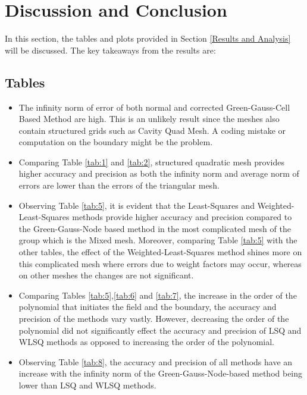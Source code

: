 \documentclass{article}
\begin{document}
\newpage
\section{Discussion and Conclusion}
In this section, the tables and plots provided in Section \ref{Results and Analysis} will be discussed. The key takeaways from the results are:
\subsection{Tables}
\label{Tables}

\begin{itemize}
    \item The infinity norm of error of both normal and corrected Green-Gauss-Cell Based Method are high. This is an unlikely result since the meshes also contain structured grids such as Cavity Quad Mesh. A coding mistake or computation on the boundary might be the problem.
    \item Comparing Table \ref{tab:1} and \ref{tab:2}, structured quadratic mesh provides higher accuracy and precision as both the infinity norm and average norm of errors are lower than the errors of the triangular mesh.
    \item Observing Table \ref{tab:5}, it is evident that the Least-Squares and Weighted-Least-Squares methods provide higher accuracy and precision compared to the Green-Gauss-Node based method in the most complicated mesh of the group which is the Mixed mesh. Moreover, comparing Table \ref{tab:5} with the other tables, the effect of the Weighted-Least-Squares method shines more on this complicated mesh where errors due to weight factors may occur, whereas on other meshes the changes are not significant.
    \item Comparing Tables \ref{tab:5},\ref{tab:6} and \ref{tab:7}, the increase in the order of the polynomial that initiates the field and the boundary, the accuracy and precision of the methods vary vastly. However, decreasing the order of the polynomial did not significantly effect the accuracy and precision of LSQ and WLSQ methods as opposed to increasing the order of the polynomial.
    \item Observing Table \ref{tab:8}, the accuracy and precision of all methods have an increase with the infinity norm of the Green-Gauss-Node-based method being lower than LSQ and WLSQ methods. 
\end{itemize}
\end{document}
